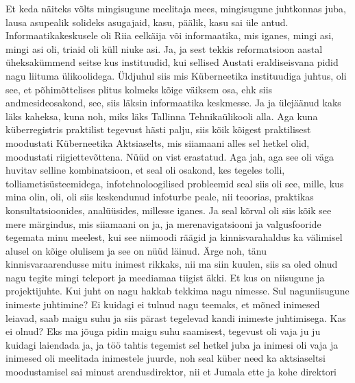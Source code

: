 Et keda näiteks võlts mingisugune meelitaja mees, mingisugune juhtkonnas juba, lausa asupealik solideks asugajaid, kasu, päälik, kasu sai üle antud. Informaatikakeskusele oli Riia eelkäija või informaatika, mis iganes, mingi asi, mingi asi oli, triaid oli küll niuke asi. Ja, ja sest tekkis reformatsioon aastal üheksakümmend seitse kus instituudid, kui sellised
Austati eraldiseisvana pidid nagu liituma ülikoolidega. Üldjuhul siis mis Küberneetika instituudiga juhtus, oli see, et põhimõttelises plitus kolmeks kõige väiksem osa, ehk siis andmesideosakond, see, siis läksin informaatika keskmesse. Ja ja ülejäänud kaks läks kaheksa, kuna noh, miks läks Tallinna Tehnikaülikooli alla. Aga kuna küberregistris praktilist tegevust hästi palju, siis kõik kõigest praktilisest moodustati Küberneetika Aktsiaselts, mis siiamaani alles sel hetkel olid, moodustati riigiettevõttena. Nüüd on vist erastatud. Aga jah, aga see oli väga huvitav selline kombinatsioon, et seal oli osakond, kes tegeles tolli, tolliametisüsteemidega, infotehnoloogilised probleemid seal siis oli see, mille, kus mina olin, oli, oli siis keskendunud infoturbe peale, nii teoorias, praktikas konsultatsioonides, analüüsides, millesse iganes. Ja seal kõrval oli siis kõik see mere märgindus, mis siiamaani on ja, ja merenavigatsiooni ja valgusfooride tegemata minu meelest, kui see niimoodi räägid ja kinnisvarahaldus ka välimisel alusel on kõige olulisem ja see on nüüd läinud. Ärge noh, tänu kinnisvaraarendusse mitu inimest rikkaks, nii ma siin kuulen, siis sa oled olnud nagu tegite mingi teleport ja meediamaa tiigist äkki. Et kus on niisugune ja projektijuhte. Kui juht on nagu hakkab tekkima nagu nimesse. Sul naguniisugune inimeste juhtimine? Ei kuidagi ei tulnud nagu teemaks, et mõned inimesed leiavad, saab maigu suhu ja siis pärast tegelevad kandi inimeste juhtimisega.
Kas ei olnud? Eks ma jõuga pidin maigu suhu saamisest, tegevust oli vaja ju ju kuidagi laiendada ja, ja töö tahtis tegemist sel hetkel juba ja inimesi oli vaja ja inimesed oli meelitada inimestele juurde, noh seal küber need ka aktsiaseltsi moodustamisel sai minust arendusdirektor, nii et Jumala ette ja kohe direktori
